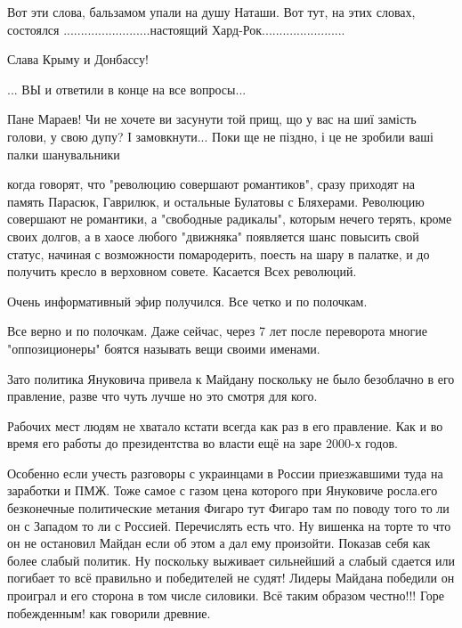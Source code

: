\begin{itemize}
Вот эти слова, бальзамом упали на душу Наташи. Вот тут, на этих словах,
состоялся .........................настоящий Хард-Рок........................

Слава Крыму и Донбассу!

... ВЫ и ответили в конце на все вопросы...


Пане Мараев! Чи не хочете ви засунути той прищ, що у вас на шиї замість голови,
у свою дупу? І замовкнути... Поки ще не піздно, і це не зробили ваші палки
шанувальники


когда говорят, что "революцию совершают романтиков", сразу приходят на память
Парасюк, Гаврилюк, и остальные Булатовы с Бляхерами.  Революцию совершают не
романтики, а "свободные радикалы", которым нечего терять, кроме своих долгов, а
в хаосе любого "движняка" появляется шанс повысить свой статус, начиная с
возможности помародерить, поесть на шару в палатке, и до получить кресло в
верховном совете.  Касается Всех революций.

Очень информативный эфир получился. Все четко и по полочкам.

Все верно и по полочкам. Даже сейчас, через 7 лет после переворота многие "оппозиционеры" боятся называть вещи своими именами.


Зато политика Януковича привела к Майдану поскольку не было безоблачно в его
правление, разве что чуть лучше но это смотря для кого.

Рабочих мест людям не хватало кстати всегда как раз в его правление. Как и во
время его работы до президентства во власти ещё на заре 2000-х годов.

\obeycr
Особенно если учесть разговоры с украинцами в России приезжавшими туда на заработки и ПМЖ.
Тоже самое с газом цена которого при Януковиче росла.его безконечные политические метания Фигаро тут Фигаро там по поводу того то ли он с Западом то ли с Россией.
Перечислять есть что.
Ну вишенка на торте то что он не остановил Майдан если об этом а дал ему произойти.
Показав себя как более слабый политик.
Ну поскольку выживает сильнейший а слабый сдается или погибает то всё правильно и победителей не судят!
Лидеры Майдана победили он проиграл и его сторона в том числе силовики.
Всё таким образом честно!!!
Горе побежденным! как говорили древние.
\restorecr


\end{itemize}
